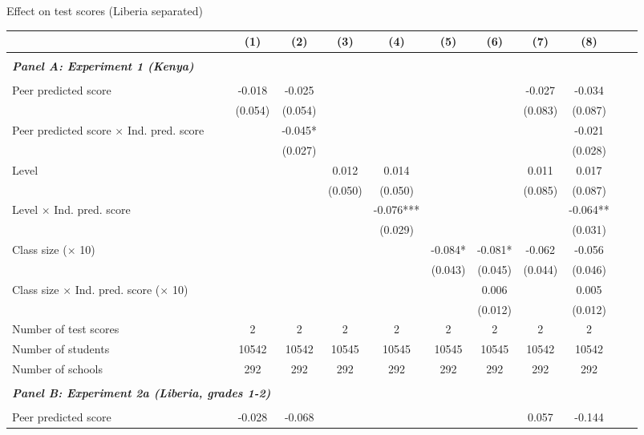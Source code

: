 \begin{center} 
\caption{\small Effect on test scores (Liberia separated)} 
\label{tab:descriptives} 
\begin{scriptsize}
\begin{threeparttable}
\begin{tabular} {@{} l l c c c c c c c c c c  @{}} \toprule \toprule
& &(1)&(2)&(3)&(4)&(5)&(6)&(7)&(8) \\ \midrule 
\\
\multicolumn{3}{l}{\textbf{\textit{Panel A: Experiment 1 (Kenya)}}} \\
\\
Peer predicted score &  & -0.018 & -0.025 &  &  &  &  & -0.027 & -0.034 \\
                 &  & (0.054) & (0.054) &  &  &  &  & (0.083) & (0.087) \\
Peer predicted score $\times$ Ind. pred. score &  &  & -0.045* &  &  &  &  &  & -0.021 \\
                 &  &  & (0.027) &  &  &  &  &  & (0.028) \\
Level &  &  &  & 0.012 & 0.014 &  &  & 0.011 & 0.017 \\
                 &  &  &  & (0.050) & (0.050) &  &  & (0.085) & (0.087) \\
Level $\times$ Ind. pred. score &  &  &  &  & -0.076*** &  &  &  & -0.064** \\
                 &  &  &  &  & (0.029) &  &  &  & (0.031) \\
Class size ($\times$ 10) &  &  &  &  &  & -0.084* & -0.081* & -0.062 & -0.056 \\
                 &  &  &  &  &  & (0.043) & (0.045) & (0.044) & (0.046) \\
Class size $\times$ Ind. pred. score ($\times$ 10) &  &  &  &  &  &  & 0.006 &  & 0.005 \\
                 &  &  &  &  &  &  & (0.012) &  & (0.012) \\
\midrule
Number of test scores &  & 2 & 2 & 2 & 2 & 2 & 2 & 2 & 2 \\
Number of students &  & 10542 & 10542 & 10545 & 10545 & 10545 & 10545 & 10542 & 10542 \\
Number of schools &  & 292 & 292 & 292 & 292 & 292 & 292 & 292 & 292 \\
 \midrule
\\
\multicolumn{3}{l}{\textbf{\textit{Panel B: Experiment 2a (Liberia, grades 1-2)}}} \\
\\
Peer predicted score &  & -0.028 & -0.068 &  &  &  &  & 0.057 & -0.144 \\

\end{tabular}
\end{threeparttable}
\end{scriptsize}
\end{center}
